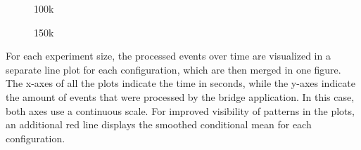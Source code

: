 \begin{figure}[h]
        \caption{100k}
        \label{fig:evaluation:performance:config-comparison_100k}
\end{figure}

\begin{figure}[h]
        \caption{150k}
        \label{fig:evaluation:performance:config-comparison_150k}
\end{figure}

For each experiment size, the processed events over time are visualized in a separate line plot for each configuration, which are then merged in one figure.
The x-axes of all the plots indicate the time in seconds, while the y-axes indicate the amount of events that were processed by the bridge application.
In this case, both axes use a continuous scale.
For improved visibility of patterns in the plots, an additional red line displays the smoothed conditional mean for each configuration.

